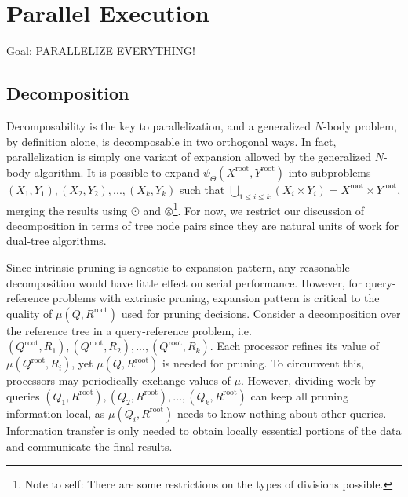 \documentclass[times, leqno,twocolumn]{article}
\newcommand{\authornote}[1]{\footnote{Note to self: #1}}
\newcommand{\authorsnote}[1]{\authornote{#1}}
\newcommand{\Union}{\bigcup}
\newcommand{\gnp}{\psi_{\Theta}}
\newcommand{\kdroot}[1]{#1^{\text{root}}}
\newcommand{\inmu}{\mu}
\begin{document}
\section{Parallel Execution}

Goal: PARALLELIZE EVERYTHING!

\subsection{Decomposition}

Decomposability is the key to parallelization, and a generalized $N$-body problem, by definition alone, is decomposable in two orthogonal ways.
In fact, parallelization is simply one variant of expansion allowed by the generalized $N$-body algorithm.
It is possible to expand $\gnp(\kdroot{X}, \kdroot{Y})$ into subproblems $(X_1,Y_1), (X_2,Y_2), ..., (X_k, Y_k)$ such that $\Union_{1 \leq i \leq k} (X_i \times Y_i) = \kdroot{X} \times \kdroot{Y}$, merging the results using $\odot$ and $\otimes$\authorsnote{There are some restrictions on the types of divisions possible.}.
For now, we restrict our discussion of decomposition in terms of tree node pairs since they are natural units of work for dual-tree algorithms.

Since intrinsic pruning is agnostic to expansion pattern, any reasonable decomposition would have little effect on serial performance.
However, for query-reference problems with extrinsic pruning, expansion pattern is critical to the quality of $\inmu(Q, \kdroot{R})$ used for pruning decisions.
Consider a decomposition over the reference tree in a query-reference problem, i.e. $(\kdroot{Q}, R_1), (\kdroot{Q}, R_2), ..., (\kdroot{Q}, R_k)$.
Each processor refines its value of $\inmu(\kdroot{Q}, R_i)$, yet $\inmu(Q, \kdroot{R})$ is needed for pruning.
To circumvent this, processors may periodically exchange values of $\mu$.
However, dividing work by queries $(Q_1, \kdroot{R}), (Q_2, \kdroot{R}), ..., (Q_k, \kdroot{R})$ can keep all pruning information local, as $\inmu(Q_i, \kdroot{R})$ needs to know nothing about other queries.
Information transfer is only needed to obtain locally essential portions of the data and communicate the final results.
\end{document}
